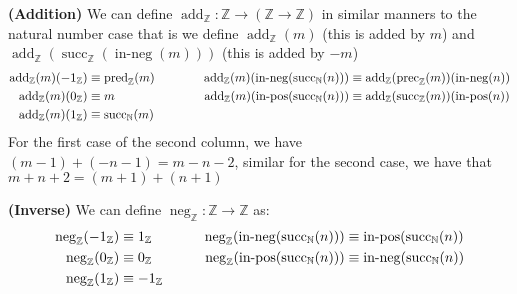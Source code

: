 \begin{definition}{\textbf{(Addition)}}
    We can define $\operatorname{add}_\mathbb{Z}:\mathbb{Z}\to(\mathbb{Z}\to \mathbb{Z})$ in similar manners to the natural number case that is we define $\operatorname{add}_\mathbb{Z}(m)$ (this is added by $m$) and $\operatorname{add}_\mathbb{Z}(\operatorname{succ}_\mathbb{Z}(\operatorname{in-neg}(m)))$ (this is added by $-m$)
    \begin{equation*}
    \begin{aligned}[t]
        \operatorname{add}_\mathbb{Z}(m)(-1_\mathbb{Z}) &\equiv\operatorname{pred}_\mathbb{Z}(m) \\ 
        \operatorname{add}_\mathbb{Z}(m)(0_\mathbb{Z}) &\equiv m \\ 
        \operatorname{add}_\mathbb{Z}(m)(1_\mathbb{Z}) &\equiv \operatorname{succ}_\mathbb{N}(m) \\ 
    \end{aligned}
    \qquad \qquad
    \begin{aligned}[t]
        \operatorname{add}_\mathbb{Z}(m)(\operatorname{in-neg}(\operatorname{succ}_\mathbb{N}(n))) &\equiv\operatorname{add}_\mathbb{Z}(\operatorname{prec}_\mathbb{Z}(m))(\operatorname{in-neg}(n)) \\ 
        \operatorname{add}_\mathbb{Z}(m)(\operatorname{in-pos}(\operatorname{succ}_\mathbb{N}(n))) &\equiv\operatorname{add}_\mathbb{Z}(\operatorname{succ}_\mathbb{Z}(m))(\operatorname{in-pos}(n)) \\ 
    \end{aligned}
    \end{equation*}
    For the first case of the second column, we have $(m-1)+(-n-1)=m-n-2$, similar for the second case, we have that $m+n+2=(m+1)+(n+1)$
\end{definition}

\begin{definition}{\textbf{(Inverse)}}
    We can define $\operatorname{neg}_\mathbb{Z}:\mathbb{Z}\to \mathbb{Z}$ as:
    \begin{equation*}
    \begin{aligned}[t]
        \operatorname{neg}_\mathbb{Z}(-1_\mathbb{Z}) &\equiv1_\mathbb{Z} \\ 
        \operatorname{neg}_\mathbb{Z}(0_\mathbb{Z}) &\equiv 0_\mathbb{Z} \\ 
        \operatorname{neg}_\mathbb{Z}(1_\mathbb{Z}) &\equiv -1_\mathbb{Z} \\ 
    \end{aligned} \qquad \quad 
    \begin{aligned}[t]
        \operatorname{neg}_\mathbb{Z}(\operatorname{in-neg}(\operatorname{succ}_\mathbb{N}(n))) &\equiv\operatorname{in-pos}(\operatorname{succ}_\mathbb{N}(n)) \\ 
        \operatorname{neg}_\mathbb{Z}(\operatorname{in-pos}(\operatorname{succ}_\mathbb{N}(n))) &\equiv\operatorname{in-neg}(\operatorname{succ}_\mathbb{N}(n)) \\ 
    \end{aligned}
    \end{equation*}
\end{definition}

